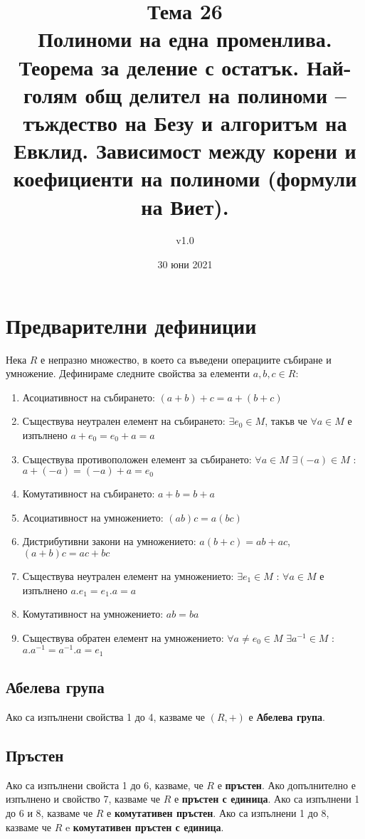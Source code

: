 \documentclass[fleqn,12pt]{article}
\title{Тема 26\\Полиноми на една променлива. Теорема за деление с остатък. Най-голям
общ делител на полиноми – тъждество на Безу и алгоритъм на Евклид.
Зависимост между корени и коефициенти на полиноми (формули на Виет).}
\author{v1.0}
\date{30 юни 2021}
\begin{document}
\maketitle

\tableofcontents

\section{Предварителни дефиниции}
Нека $R$ е непразно множество, в което са въведени операциите събиране и умножение.
Дефинираме следните свойства за елементи $a,b,c \in R$:
\begin{enumerate}
    \item \label{prop:add_assoc} Асоциативност на събирането: $(a + b) + c = a + (b + c)$
    \item \label{prop:add_neutral} Съществува неутрален елемент на събирането: $\exists e_0 \in M$, такъв че $\forall a \in M$ е изпълнено $a + e_0 = e_0 + a = a$
    \item \label{prop:add_inverse} Съществува противоположен елемент за събирането: $\forall a \in M$ $\exists (-a) \in M$ : $a + (-a) = (-a) + a = e_0$
    \item \label{prop:add_commute} Комутативност на събирането: $a + b = b + a$
    \item \label{prop:mul_assoc} Асоциативност на умножението: $(ab)c = a(bc)$
    \item \label{prop:mul_distr} Дистрибутивни закони на умножението: $a(b + c) = ab + ac$, $(a + b)c = ac + bc$
    \item \label{prop:mul_neutral} Съществува неутрален елемент на умножението: $\exists e_1 \in M$ : $\forall a \in M$ е изпълнено $a . e_1 = e_1 . a = a$
    \item \label{prop:mul_commute} Комутативност на умножението: $ab = ba$
    \item \label{prop:mul_inverse} Съществува обратен елемент на умножението: $\forall a \neq e_0 \in M$ $\exists a^{-1} \in M$ : $a . a^{-1} = a^{-1} . a = e_1$
\end{enumerate}

\subsection{Абелева група}
Ако са изпълнени свойства 1 до 4, казваме че $(R, +)$ е \textbf{Абелева група}.

\subsection{Пръстен}
Ако са изпълнени свойста 1 до 6, казваме, че $R$ е \textbf{пръстен}.
Ако допълнително е изпълнено и свойство 7, казваме че $R$ е \textbf{пръстен с единица}.
Ако са изпълнени 1 до 6 и 8, казваме че $R$ е \textbf{комутативен пръстен}.
Ако са изпълнени 1 до 8, казваме че $R$ e \textbf{комутативен пръстен с единица}.
\end{document}
